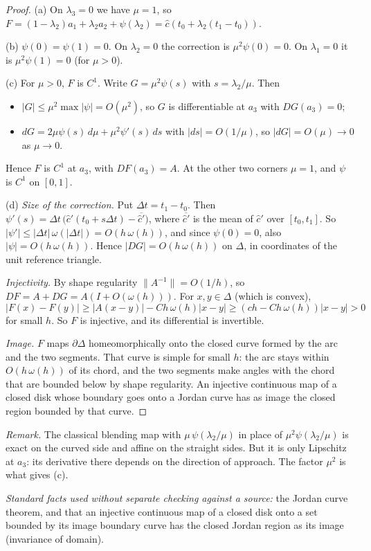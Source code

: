 \begin{proof}
(a) On $\lambda_3=0$ we have $\mu=1$, so $F=(1-\lambda_2)a_1+\lambda_2a_2+\psi(\lambda_2)=\hat c(t_0+\lambda_2(t_1-t_0))$.

(b) $\psi(0)=\psi(1)=0$. On $\lambda_2=0$ the correction is $\mu^2\psi(0)=0$. On $\lambda_1=0$ it is
$\mu^2\psi(1)=0$ (for $\mu>0$).

(c) For $\mu>0$, $F$ is $C^1$. Write $G=\mu^2\psi(s)$ with $s=\lambda_2/\mu$. Then
\begin{itemize}
\item $|G|\le\mu^2\max|\psi|=O(\mu^2)$, so $G$ is differentiable at $a_3$ with $DG(a_3)=0$;
\item $dG=2\mu\psi(s)\,d\mu+\mu^2\psi'(s)\,ds$ with $|ds|=O(1/\mu)$, so $|dG|=O(\mu)\to0$ as $\mu\to0$.
\end{itemize}
Hence $F$ is $C^1$ at $a_3$, with $DF(a_3)=A$. At the other two corners $\mu=1$, and $\psi$ is $C^1$ on $[0,1]$.

(d) \emph{Size of the correction.} Put $\Delta t=t_1-t_0$. Then $\psi'(s)=\Delta t\,\bigl(\hat c'(t_0+s\Delta t)-\overline{\hat
c'}\bigr)$, where $\overline{\hat c'}$ is the mean of $\hat c'$ over $[t_0,t_1]$. So $|\psi'|\le|\Delta t|\,\omega(|\Delta
t|)=O(h\,\omega(h))$, and since $\psi(0)=0$, also $|\psi|=O(h\,\omega(h))$. Hence $|DG|=O(h\,\omega(h))$ on $\Delta$, in
coordinates of the unit reference triangle.

\emph{Injectivity.} By shape regularity $\|A^{-1}\|=O(1/h)$, so $DF=A+DG=A(I+O(\omega(h)))$. For $x,y\in\Delta$ (which is
convex),
\[
|F(x)-F(y)|\ge|A(x-y)|-Ch\,\omega(h)|x-y|\ge(ch-Ch\,\omega(h))|x-y|>0
\]
for small $h$. So $F$ is injective, and its differential is invertible.

\emph{Image.} $F$ maps $\partial\Delta$ homeomorphically onto the closed curve formed by the arc and the two segments.
That curve is simple for small $h$: the arc stays within $O(h\,\omega(h))$ of its chord, and the two segments make
angles with the chord that are bounded below by shape regularity. An injective continuous map of a closed disk whose
boundary goes onto a Jordan curve has as image the closed region bounded by that curve.
\end{proof}

\emph{Remark.} The classical blending map with $\mu\,\psi(\lambda_2/\mu)$ in place of $\mu^2\psi(\lambda_2/\mu)$ is
exact on the curved side and affine on the straight sides. But it is only Lipschitz at $a_3$: its derivative there
depends on the direction of approach. The factor $\mu^2$ is what gives (c).

\emph{Standard facts used without separate checking against a source:} the Jordan curve theorem, and that an injective
continuous map of a closed disk onto a set bounded by its image boundary curve has the closed Jordan region as its
image (invariance of domain).
